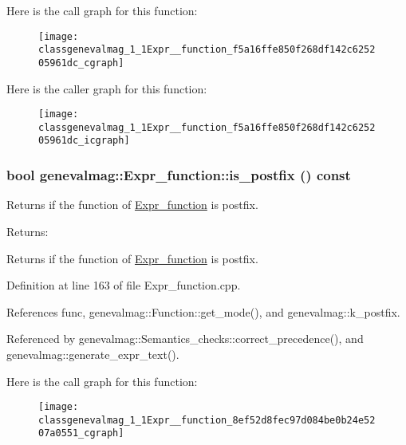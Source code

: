Here is the call graph for this function:\nopagebreak
\begin{figure}[H]
\begin{center}
\leavevmode
\texttt{[image: classgenevalmag\_1\_1Expr\_\_function\_f5a16ffe850f268df142c625205961dc\_cgraph]}
\end{center}
\end{figure}


Here is the caller graph for this function:\nopagebreak
\begin{figure}[H]
\begin{center}
\leavevmode
\texttt{[image: classgenevalmag\_1\_1Expr\_\_function\_f5a16ffe850f268df142c625205961dc\_icgraph]}
\end{center}
\end{figure}
\hypertarget{classgenevalmag_1_1Expr__function_8ef52d8fec97d084be0b24e5207a0551}{
\subsubsection[{is\_\-postfix}]{\setlength{\rightskip}{0pt plus 5cm}bool genevalmag::Expr\_\-function::is\_\-postfix () const}}
\label{classgenevalmag_1_1Expr__function_8ef52d8fec97d084be0b24e5207a0551}


Returns if the function of \hyperlink{classgenevalmag_1_1Expr__function}{Expr\_\-function} is postfix. \begin{Desc}
\item[Returns:]\end{Desc}
Returns if the function of \hyperlink{classgenevalmag_1_1Expr__function}{Expr\_\-function} is postfix. 

Definition at line 163 of file Expr\_\-function.cpp.

References func, genevalmag::Function::get\_\-mode(), and genevalmag::k\_\-postfix.

Referenced by genevalmag::Semantics\_\-checks::correct\_\-precedence(), and genevalmag::generate\_\-expr\_\-text().

Here is the call graph for this function:\nopagebreak
\begin{figure}[H]
\begin{center}
\leavevmode
\texttt{[image: classgenevalmag\_1\_1Expr\_\_function\_8ef52d8fec97d084be0b24e5207a0551\_cgraph]}
\end{center}
\end{figure}


